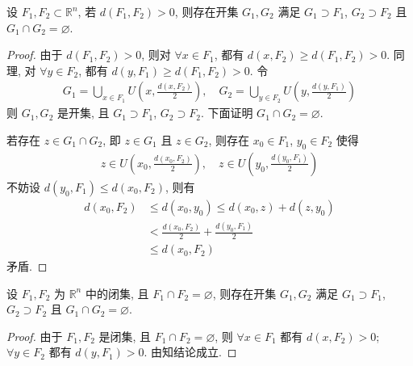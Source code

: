 \documentclass[../../main.tex]{subfiles}
\begin{document}
\begin{theorem}\label{theorem:距离大于零的两个集合中一定存在两个无交的子集}
设 $F_1, F_2 \subset \mathbb{R}^n$, 若 $d(F_1, F_2) > 0$, 则存在开集 $G_1, G_2$ 满足 $G_1 \supset F_1$, $G_2 \supset F_2$ 且 $G_1 \cap G_2 = \varnothing$.
\end{theorem}
\begin{proof}
由于 $d(F_1, F_2) > 0$, 则对 $\forall x \in F_1$, 都有 $d(x, F_2) \geqslant d(F_1, F_2) > 0$. 同理, 对 $\forall y \in F_2$, 都有 $d(y, F_1) \geqslant d(F_1, F_2) > 0$. 令
\begin{align*}
G_1 = \bigcup_{x \in F_1} U\left(x, \frac{d(x, F_2)}{2}\right), \quad G_2 = \bigcup_{y \in F_2} U\left(y, \frac{d(y, F_1)}{2}\right)
\end{align*}
则 $G_1, G_2$ 是开集, 且 $G_1 \supset F_1$, $G_2 \supset F_2$. 下面证明 $G_1 \cap G_2 = \varnothing$.

若存在 $z \in G_1 \cap G_2$, 即 $z \in G_1$ 且 $z \in G_2$, 则存在 $x_0 \in F_1$, $y_0 \in F_2$ 使得
\begin{align*}
z \in U\left(x_0, \frac{d(x_0, F_2)}{2}\right), \quad z \in U\left(y_0, \frac{d(y_0, F_1)}{2}\right)
\end{align*}
不妨设 $d(y_0, F_1) \leqslant d(x_0, F_2)$, 则有
\begin{align*}
d(x_0, F_2) &\leqslant d(x_0, y_0) \leqslant d(x_0, z) + d(z, y_0)\\
&< \frac{d(x_0, F_2)}{2} + \frac{d(y_0, F_1)}{2}\\
&\leqslant d(x_0, F_2)
\end{align*}
矛盾.

\end{proof}

\begin{theorem}[分离定理]\label{theorem:分离定理}
设 $F_1, F_2$ 为 $\mathbb{R}^n$ 中的闭集, 且 $F_1 \cap F_2 = \varnothing$, 则存在开集 $G_1, G_2$ 满足 $G_1 \supset F_1$, $G_2 \supset F_2$ 且 $G_1 \cap G_2 = \varnothing$.
\end{theorem}
\begin{proof}
由于 $F_1, F_2$ 是闭集, 且 $F_1 \cap F_2 = \varnothing$, 则 $\forall x \in F_1$ 都有 $d(x, F_2) > 0$; $\forall y \in F_2$ 都有 $d(y, F_1) > 0$. 由知结论成立.

\end{proof}
\end{document}
